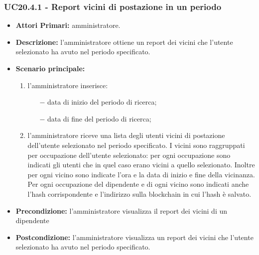 \subsubsection{ UC20.4.1 - Report vicini di postazione in un periodo}
\begin{itemize}
	\item\textbf{Attori Primari:} 
	amministratore.
	\item\textbf{Descrizione:} 
	l'amministratore ottiene un report dei vicini che l'utente selezionato ha avuto nel periodo specificato.
	\item\textbf{Scenario principale:} 
	\begin{enumerate}
		\item l'amministratore inserisce:
		\begin{itemize}
			\item[$-$] data di inizio del periodo di ricerca;
			\item[$-$] data di fine del periodo di ricerca;
		\end{itemize}
		\item l'amministratore riceve una lista degli utenti vicini di postazione dell'utente selezionato nel periodo specificato. I vicini sono raggruppati per occupazione dell'utente selezionato: per ogni occupazione sono indicati gli utenti che in quel caso erano vicini a quello selezionato. Inoltre per ogni vicino sono indicate l'ora e la data di inizio e fine della vicinanza. Per ogni occupazione del dipendente e di ogni vicino sono indicati anche l'hash corrispondente e l'indirizzo sulla blockchain in cui l'hash è salvato.
	\end{enumerate}
	\item\textbf{Precondizione:} 
	l'amministratore visualizza il report dei vicini di un dipendente
	\item\textbf{Postcondizione:}
	l'amministratore visualizza un report dei vicini che l'utente selezionato ha avuto nel periodo specificato.
\end{itemize}



